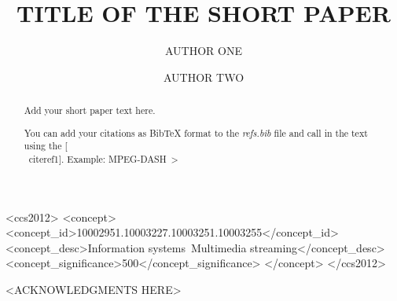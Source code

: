 \documentclass[sigconf]{acmart}
\begin{document}
\title{TITLE OF THE SHORT PAPER}

\author{AUTHOR ONE}

\author{AUTHOR TWO}

\renewcommand{\shortauthors}{<SURNAME OF FIRST AUTHOR>~\emph{et al.~}}


\begin{CCSXML}
<ccs2012>
   <concept>
       <concept_id>10002951.10003227.10003251.10003255</concept_id>
       <concept_desc>Information systems~Multimedia streaming</concept_desc>
       <concept_significance>500</concept_significance>
       </concept>
 </ccs2012>
\end{CCSXML}



\begin{abstract}
Add your short paper text here.

You can add your citations as BibTeX format to the \emph{refs.bib} file and call in the text using the [\\~cite{ref1}]. Example: MPEG-DASH~\cite{ref1}>
\end{abstract}

\maketitle



\begin{acks}
<ACKNOWLEDGMENTS HERE>
\end{acks}



\end{document}
